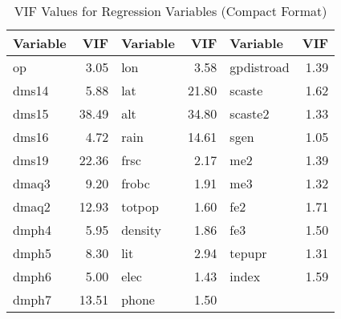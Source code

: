 \begin{table}[ht]
\centering
\begin{tabular}{lrlrlr}
  \hline
Variable & VIF & Variable & VIF & Variable & VIF \\ 
  \hline
op & 3.05 & lon & 3.58 & gpdistroad & 1.39 \\ 
  dms14 & 5.88 & lat & 21.80 & scaste & 1.62 \\ 
  dms15 & 38.49 & alt & 34.80 & scaste2 & 1.33 \\ 
  dms16 & 4.72 & rain & 14.61 & sgen & 1.05 \\ 
  dms19 & 22.36 & frsc & 2.17 & me2 & 1.39 \\ 
  dmaq3 & 9.20 & frobc & 1.91 & me3 & 1.32 \\ 
  dmaq2 & 12.93 & totpop & 1.60 & fe2 & 1.71 \\ 
  dmph4 & 5.95 & density & 1.86 & fe3 & 1.50 \\ 
  dmph5 & 8.30 & lit & 2.94 & tepupr & 1.31 \\ 
  dmph6 & 5.00 & elec & 1.43 & index & 1.59 \\ 
  dmph7 & 13.51 & phone & 1.50 &  &  \\ 
   \hline
\end{tabular}
\caption{VIF Values for Regression Variables (Compact Format)} 
\label{tab:vif_values_compact}
\end{table}
